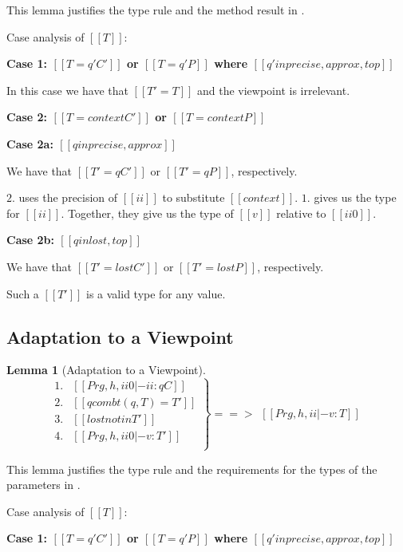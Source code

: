 \documentclass[final,10pt,twoside]{article}
\def\qed{\unskip\kern 10pt{\unitlength1pt\linethickness{.4pt}\framebox(6,6){}}}
\newtheorem{lemma}[definition]{Lem\-ma}
\newcommand\proofcase[1]{\vspace{4mm plus 1mm minus 1mm}\noindent\textbf{#1}}
\begin{document}
\noindent
This lemma justifies the type rule  and the
method result in .

Case analysis of $[[T]]$:

\proofcase{Case 1: $[[T = q' C']]$ or $[[T = q' P]]$ where
  $[[q' in {precise, approx, top}]]$}

In this case we have that $[[T' = T]]$ and the viewpoint is
irrelevant.


\proofcase{Case 2: $[[T = context C']]$ or $[[T = context P]]$}

\proofcase{Case 2a: $[[q in {precise, approx}]]$}

We have that $[[T'= q C']]$ or $[[T'= q P]]$, respectively.

$2.$ uses the precision of $[[ii]]$ to substitute $[[context]]$.
$1.$ gives us the type for $[[ii]]$.
Together, they give us the type of $[[v]]$ relative to $[[ii0]]$.

\proofcase{Case 2b: $[[q in {lost, top}]]$}

We have that $[[T'= lost C']]$ or $[[T'= lost P]]$, respectively.

Such a $[[T']]$ is a valid type for any value.
\qed




\subsection{Adaptation to a Viewpoint}

\begin{lemma}[Adaptation to a Viewpoint]
\label{lemma:decomp}
\[
\left.
\begin{array}{ll}
1. & [[Prg, h, ii0 |- ii : q C]]\\
2. & [[qcombt(q, T) = T']]\\
3. & [[lost notin T']]\\
4. & [[Prg, h, ii0 |- v : T']]\\
\end{array}
\right\} ==>
\begin{array}{l}
[[Prg, h, ii |- v : T]]
\end{array}
\]
\end{lemma}

\noindent
This lemma justifies the type rule  and the
requirements for the types of the parameters in
.


Case analysis of $[[T]]$:

\proofcase{Case 1: $[[T = q' C']]$ or $[[T = q' P]]$ where
  $[[q' in {precise, approx, top}]]$}
\end{document}
